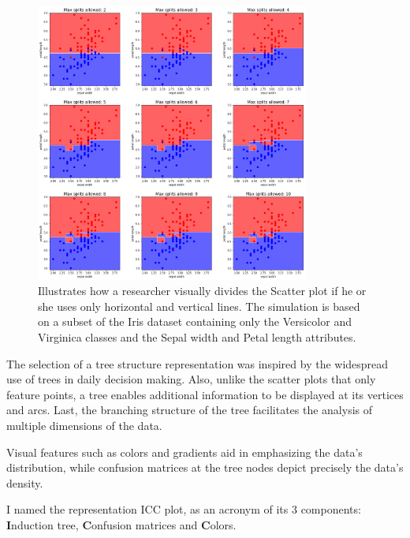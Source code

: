 \documentclass[12pt]{article}
\begin{document}
\begin{figure}[h]
\centering
\includegraphics[width=0.8\textwidth]{scatter_plot_illustration.png}

\caption{Illustrates how a researcher visually divides the Scatter plot if he or she uses only horizontal and vertical lines. The simulation is based on a subset of the Iris dataset containing only the Versicolor and Virginica classes and the Sepal width and Petal length attributes.}
\label{fig:fig1}

\end{figure}

The selection of a tree structure representation was inspired by the widespread use of trees in daily decision making. Also, unlike the scatter plots that only feature points, a tree enables additional information to be displayed at its vertices and arcs. Last, the branching structure of the tree facilitates the analysis of multiple dimensions of the data.

Visual features such as colors and gradients aid in emphasizing the data's distribution, while confusion matrices at the tree nodes depict precisely the data's density.

I named the representation ICC plot, as an acronym of its 3 components: \textbf{I}nduction tree, \textbf{C}onfusion matrices and \textbf{C}olors.
\end{document}
